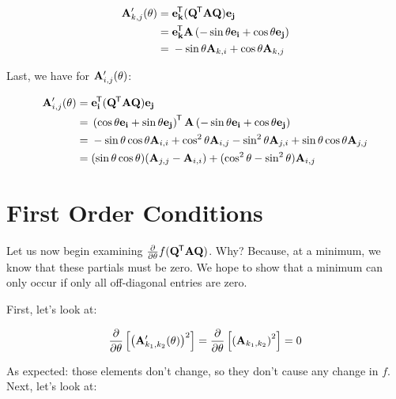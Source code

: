 \documentclass[11pt, oneside]{amsart}
\begin{document}
\begin{equation*}
  \begin{split}
    \mathbf{A}'_{k, j}(\theta)
      ={}& \mathbf{e}_{\mathbf{k}}^{\mkern-1.5mu\mathsf{T}} (\mathbf{Q}^{\mkern-1.5mu\mathsf{T}} \mathbf{A} \mathbf{Q}) \mathbf{e}_{\mathbf{j}} \\
      ={}& \mathbf{e}_{\mathbf{k}}^{\mkern-1.5mu\mathsf{T}} \mathbf{A} \left(
        -\sin\theta \mathbf{e}_{\mathbf{i}} + \cos\theta \mathbf{e}_{\mathbf{j}}
      \right) \\
      ={}& -\sin\theta \mathbf{A}_{k, i} + \cos\theta \mathbf{A}_{k, j}
  \end{split}
\end{equation*}

Last, we have for $\mathbf{A}'_{i, j}(\theta)$:

\begin{equation*}
  \begin{split}
    \mathbf{A}'_{i, j}(\theta)
      ={}& \mathbf{e}_{\mathbf{i}}^{\mkern-1.5mu\mathsf{T}} (\mathbf{Q}^{\mkern-1.5mu\mathsf{T}} \mathbf{A} \mathbf{Q}) \mathbf{e}_{\mathbf{j}} \\
      ={}&
        \left( \cos\theta\mathbf{e}_{\mathbf{i}} + \sin\theta\mathbf{e}_{\mathbf{j}} \right)^{\mkern-1.5mu\mathsf{T}}
        \mathbf{A}
        \left( -\sin\theta\mathbf{e}_{\mathbf{i}} + \cos\theta\mathbf{e}_{\mathbf{j}} \right)\\
      ={}&
        -\sin\theta\cos\theta \mathbf{A}_{i, i}
        + \cos^2\theta \mathbf{A}_{i, j}
        -\sin^2\theta \mathbf{A}_{j, i}
        +\sin\theta\cos\theta \mathbf{A}_{j, j} \\
      ={}&
        (\sin\theta\cos\theta)(\mathbf{A}_{j, j} - \mathbf{A}_{i, i})
        + (\cos^2\theta - \sin^2\theta) \mathbf{A}_{i, j}
  \end{split}
\end{equation*}

\section{First Order Conditions}

Let us now begin examining $\frac{\partial }{\partial \theta} f(\mathbf{Q}^{\mkern-1.5mu\mathsf{T}} \mathbf{A} \mathbf{Q})$. Why?
Because, at a minimum, we know that these partials must be zero. We hope
to show that a minimum can only occur if only all off-diagonal entries
are zero.

First, let's look at:

\begin{equation*}
  \begin{split}
    \frac{\partial }{\partial \theta} \left[ \left( \mathbf{A}'_{k_1, k_2}(\theta) \right)^2 \right]
      = \frac{\partial }{\partial \theta} \left[ \left( \mathbf{A}_{k_1, k_2} \right)^2 \right]
      = 0
  \end{split}
\end{equation*}

As expected: those elements don't change, so they don't cause any change
in $f$. Next, let's look at:
\end{document}

